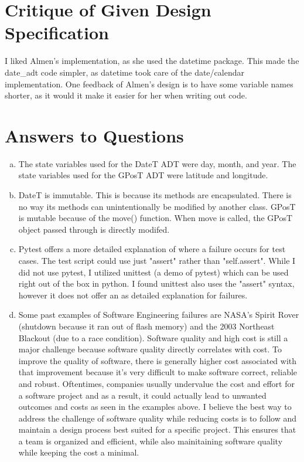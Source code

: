 \documentclass[12pt]{article}
\begin{document}
\section{Critique of Given Design Specification}

I liked Almen's implementation, as she used the datetime package. This made the date\_adt code simpler, as datetime took care of the date/calendar implementation. One feedback of Almen's design is to have some variable names shorter, as it would it make it easier for her when writing out code. 

\section{Answers to Questions}

\begin{enumerate}[(a)]

\item 
The state variables used for the DateT ADT were day, month, and year. The state variables used for the GPosT ADT were latitude and longitude.

\item 
DateT is immutable. This is because its methods are encapsulated. There is no way its methods can unintentionally be modified by another class. GPosT is mutable because of the move() function. When move is called, the GPosT object passed through is directly modifed.

\item 
Pytest offers a more detailed explanation of where a failure occurs for test cases. The test script could use just "assert" rather than "self.assert". While I did not use pytest, I utilized unittest (a demo of pytest) which can be used right out of the box in python. I found unittest also uses the "assert" syntax, however it does not offer an as detailed explanation for failures.

\item 
Some past examples of Software Engineering failures are NASA's Spirit Rover (shutdown because it ran out of flash memory) and the 2003 Northeast Blackout (due to a race condition).
\newline
Software quality and high cost is still a major challenge because software quality directly correlates with cost. To improve the quality of software, there is generally higher cost associated with that improvement because it's very difficult to make software correct, reliable and robust. Oftentimes, companies usually undervalue the cost and effort for a software project and as a result, it could actually lead to unwanted outcomes and costs as seen in the examples above. I believe the best way to address the challenge of software quality while reducing costs is to follow and maintain a design process best suited for a specific project. This ensures that a team is organized and efficient, while also mainitaining software quality while keeping the cost a minimal. 


\end{enumerate}
\end{document}
